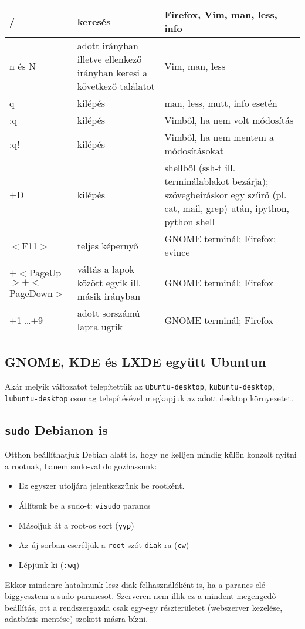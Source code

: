\documentclass[a4paper]{article}
\newcommand{\code}{\texttt}
\newcommand{\Esc}{\framebox{\texttt{Esc}}}
\newcommand{\Ctrl}{\framebox{\texttt{Ctrl}}}
\newcommand{\Alt}{\framebox{\texttt{Alt}}}
\begin{document}
\noindent
\begin{tabularx}{\textwidth}{|l|X|X|}
\hline
/ & keresés &Firefox, Vim, man, less, info\\
\hline
n és N& adott irányban illetve ellenkező irányban keresi a következő
találatot&Vim, man, less\\
\hline
q& kilépés& man, less, mutt, info esetén\\
\hline
:q& kilépés& Vimből, ha nem volt módosítás\\
\hline
:q!& kilépés& Vimből, ha nem mentem a  módosításokat\\
\hline
\Ctrl$+$D& kilépés& shellből (ssh-t ill. terminálablakot bezárja); szövegbeíráskor  egy
szűrő (pl. cat, mail, grep) után, ipython, python shell\\
\hline
$<$F11$>$& teljes képernyő& GNOME terminál; Firefox; evince\\
\hline
\Ctrl$+<$PageUp$>$\quad \Ctrl$+<$PageDown$>$& váltás a lapok között
egyik ill. másik irányban&
GNOME terminál; Firefox\\
\hline
\Alt$+$1 \dots \Alt$+$9& adott sorszámú lapra ugrik& GNOME terminál; Firefox\\
\hline
\end{tabularx}

\subsection{GNOME, KDE és LXDE együtt Ubuntun}
Akár melyik változatot telepítettük az
\code{ubuntu-desktop},
\code{kubuntu-desktop},
\code{lubuntu-desktop} csomag telepítésével megkapjuk az adott
desktop környezetet.

\subsection{\code{sudo} Debianon is}
Otthon beállíthatjuk Debian alatt is, hogy ne kelljen mindig külön
konzolt nyitni a rootnak, hanem sudo-val dolgozhassunk:
\begin{itemize}
\item Ez egyszer utoljára jelentkezzünk be rootként.
\item Állítsuk be a sudo-t: \code{visudo} parancs
\item Másoljuk át a root-os sort (\code{yyp})
\item Az új sorban cseréljük a \code{root} szót \code{diak}-ra (\code{cw})
\item Lépjünk ki (\code{\Esc:wq})
\end{itemize}
Ekkor mindenre hatalmunk lesz diak felhasználóként is, ha a parancs elé
biggyesztem a sudo parancsot. Szerveren nem illik ez a mindent
megengedő beállítás, ott a rendszergazda csak egy-egy részterületet
(webszerver kezelése, adatbázis mentése) szokott másra bízni.

\newpage
\tableofcontents
\end{document}
